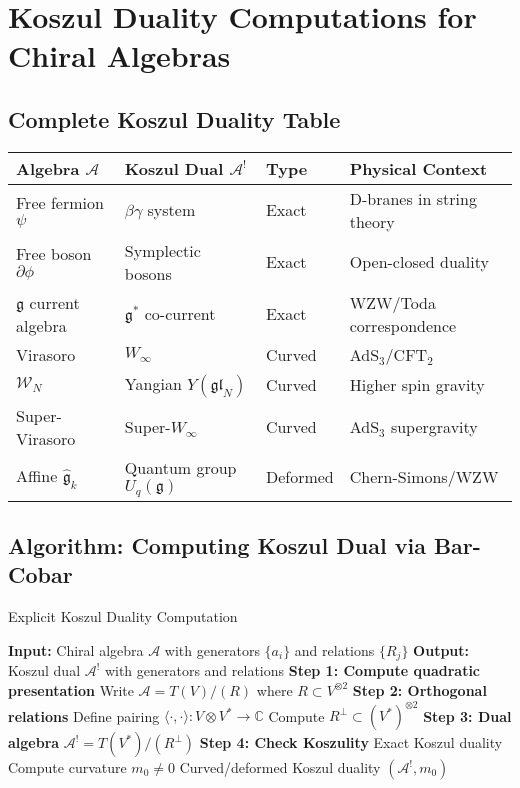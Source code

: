 \section{Koszul Duality Computations for Chiral Algebras}

\subsection{Complete Koszul Duality Table}

\begin{center}
\begin{tabular}{|l|l|l|l|}
\hline
\textbf{Algebra $\mathcal{A}$} & \textbf{Koszul Dual $\mathcal{A}^!$} & \textbf{Type} & \textbf{Physical Context} \\
\hline
Free fermion $\psi$ & $\beta\gamma$ system & Exact & D-branes in string theory \\
Free boson $\partial\phi$ & Symplectic bosons & Exact & Open-closed duality \\
$\mathfrak{g}$ current algebra & $\mathfrak{g}^*$ co-current & Exact & WZW/Toda correspondence \\
Virasoro & $W_\infty$ & Curved & AdS$_3$/CFT$_2$ \\
$\mathcal{W}_N$ & Yangian $Y(\mathfrak{gl}_N)$ & Curved & Higher spin gravity \\
Super-Virasoro & Super-$W_\infty$ & Curved & AdS$_3$ supergravity \\
Affine $\hat{\mathfrak{g}}_k$ & Quantum group $U_q(\mathfrak{g})$ & Deformed & Chern-Simons/WZW \\
\hline
\end{tabular}
\end{center}

\subsection{Algorithm: Computing Koszul Dual via Bar-Cobar}

\begin{algorithm}[htbp]
\caption{Explicit Koszul Duality Computation}
\begin{algorithmic}[1]
\State \textbf{Input:} Chiral algebra $\mathcal{A}$ with generators $\{a_i\}$ and relations $\{R_j\}$
\State \textbf{Output:} Koszul dual $\mathcal{A}^!$ with generators and relations
\State
\State \textbf{Step 1: Compute quadratic presentation}
\State Write $\mathcal{A} = T(V)/(R)$ where $R \subset V^{\otimes 2}$
\State
\State \textbf{Step 2: Orthogonal relations}
\State Define pairing $\langle \cdot, \cdot \rangle: V \otimes V^* \to \mathbb{C}$
\State Compute $R^\perp \subset (V^*)^{\otimes 2}$
\State
\State \textbf{Step 3: Dual algebra}
\State $\mathcal{A}^! = T(V^*)/(R^\perp)$
\State
\State \textbf{Step 4: Check Koszulity}
    \State Exact Koszul duality
\Else
    \State Compute curvature $m_0 \neq 0$
    \State Curved/deformed Koszul duality
\EndIf
\State
\State \Return $(\mathcal{A}^!, m_0)$
\end{algorithmic}
\end{algorithm}

